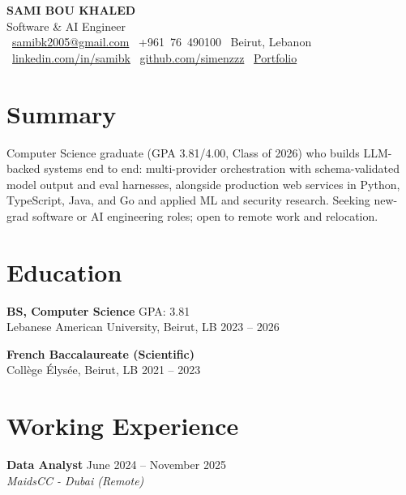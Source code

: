 \documentclass[11pt, a4paper]{article}
\begin{document}
\begin{center}
  {\LARGE\bfseries SAMI BOU KHALED} \\[4pt]
  {\large Software \& AI Engineer} \\[6pt]
  \faEnvelope\ \href{mailto:samibk2005@gmail.com}{samibk2005@gmail.com} \quad
  \faPhone\ +961~76~490100 \quad
  \faMapMarker*\ Beirut, Lebanon \\[2pt]
  \faLinkedin\ \href{https://www.linkedin.com/in/samibk/}{linkedin.com/in/samibk} \quad
  \faGithub\ \href{https://github.com/simenzzz}{github.com/simenzzz} \quad
  \faGlobe\ \href{https://samibk.com/}{Portfolio}
\end{center}

\section{Summary}

Computer Science graduate (GPA 3.81/4.00, Class of 2026) who builds LLM-backed
systems end to end: multi-provider orchestration with schema-validated model
output and eval harnesses, alongside production web services in Python,
TypeScript, Java, and Go and applied ML and security research. Seeking new-grad
software or AI engineering roles; open to remote work and relocation.

\section{Education}

\textbf{BS, Computer Science} \hfill GPA: 3.81 \\
Lebanese American University, Beirut, LB \hfill 2023 -- 2026

\medskip

\textbf{French Baccalaureate (Scientific)} \\
Coll\`ege \'Elys\'ee, Beirut, LB \hfill 2021 -- 2023

\section{Working Experience}

\textbf{Data Analyst} \hfill June 2024 -- November 2025 \\
\textit{MaidsCC - Dubai (Remote)}
\end{document}
